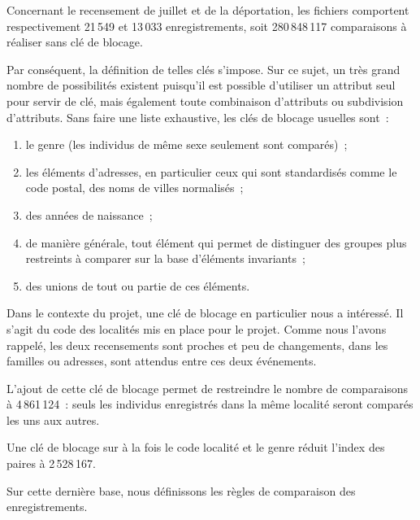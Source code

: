 \documentclass[a4paper,12pt,twoside]{book}
\begin{document}
                Concernant le recensement de juillet et de la déportation, les fichiers comportent respectivement 21\,549 et 13\,033 enregistrements, soit 280\,848\,117 comparaisons à réaliser sans clé de blocage.
                
                Par conséquent, la définition de telles clés s'impose. Sur ce sujet, un très grand nombre de possibilités existent puisqu'il est possible d'utiliser un attribut seul pour servir de clé, mais également toute combinaison d'attributs ou subdivision d'attributs. Sans faire une liste exhaustive, les clés de blocage usuelles sont~:
                
                \begin{enumerate}
                    \item le genre (les individus de même sexe seulement sont comparés)~;
                    \item les éléments d'adresses, en particulier ceux qui sont standardisés comme le code postal, des noms de villes normalisés~;
                    \item des années de naissance~;
                    \item de manière générale, tout élément qui permet de distinguer des groupes plus restreints à comparer sur la base d'éléments invariants~;
                    \item des unions de tout ou partie de ces éléments.
                \end{enumerate}
                
                Dans le contexte du projet, une clé de blocage en particulier nous a intéressé. Il s'agit du code des localités mis en place pour le projet. Comme nous l'avons rappelé, les deux recensements sont proches et peu de changements, dans les familles ou adresses, sont attendus entre ces deux événements.
                
                L'ajout de cette clé de blocage permet de restreindre le nombre de comparaisons à 4\,861\,124~: seuls les individus enregistrés dans la même localité seront comparés les uns aux autres.
                
                
                Une clé de blocage sur à la fois le code localité et le genre réduit l'index des paires à 2\,528\,167.
                \newline
                
                Sur cette dernière base, nous définissons les règles de comparaison des enregistrements.
                
\end{document}
